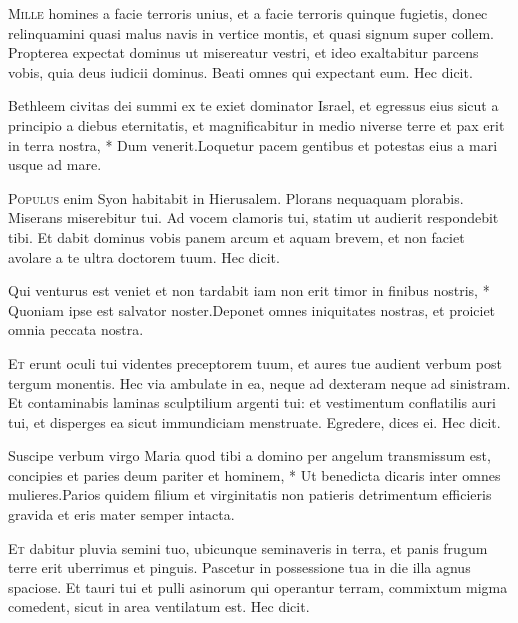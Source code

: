 \begin{multicols*}{2}
\lettrine[lines=2]{\zallmancaps \color{Red} M}{ille} homines a facie terroris unius, et a facie terroris quinque fugietis, donec relinquamini quasi malus navis in vertice montis, et quasi signum super collem. Propterea expectat dominus ut misereatur vestri, et ideo exaltabitur parcens vobis, quia deus iudicii dominus. Beati omnes qui expectant eum. Hec dicit.
\begin{responsory}
{Bethleem civitas dei summi ex te exiet dominator Israel, et egressus eius sicut a principio a diebus eternitatis, et magnificabitur in medio niverse terre et pax erit in terra nostra, * Dum venerit.}{Loquetur pacem gentibus et potestas eius a mari usque ad mare.}
\end{responsory}
\lettrine[lines=2]{\zallmancaps \color{Blue} P}{opulus} enim Syon habitabit in Hierusalem. Plorans nequaquam plorabis. Miserans miserebitur tui. Ad vocem clamoris tui, statim ut audierit respondebit tibi. Et dabit dominus vobis panem arcum et aquam brevem, et non faciet
avolare a te ultra doctorem tuum. Hec dicit.
\begin{responsory-doxology}
{Qui venturus est veniet et non tardabit iam non erit timor in finibus nostris, * Quoniam ipse est salvator noster.}{Deponet omnes iniquitates nostras, et proiciet omnia peccata nostra.}
\end{responsory-doxology}
\lettrine[lines=2]{\zallmancaps \color{Red} E}{t} erunt oculi tui videntes preceptorem tuum, et aures tue audient verbum post tergum monentis. Hec via ambulate in ea, neque ad dexteram neque ad sinistram. Et contaminabis laminas sculptilium argenti tui: et vestimentum conflatilis auri tui, et disperges ea sicut immundiciam menstruate. Egredere, dices ei. Hec dicit.
\begin{responsory}
{Suscipe verbum virgo Maria quod tibi a domino per angelum transmissum est, concipies et paries deum pariter et hominem, * Ut benedicta dicaris inter omnes mulieres.}{Parios quidem filium et virginitatis non patieris detrimentum efficieris gravida et eris mater semper intacta.}
\end{responsory}
\lettrine[lines=2]{\zallmancaps \color{Blue} E}{t} dabitur pluvia semini tuo, ubicunque seminaveris in terra, et panis frugum terre erit uberrimus et pinguis. Pascetur in possessione tua in die illa agnus spaciose. Et tauri tui et pulli asinorum qui operantur terram, commixtum migma comedent, sicut in area ventilatum est. Hec dicit.

\end{multicols*}
